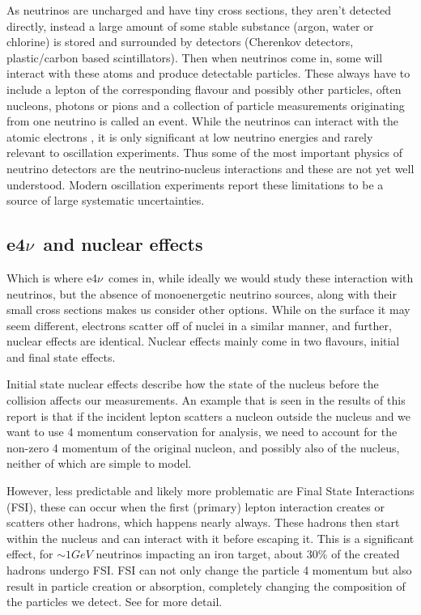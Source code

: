 \documentclass[a4paper,12pt]{article}
\newcommand{\efn}{e4$\nu$}
\begin{document}
As neutrinos are uncharged and have tiny cross sections, they aren't detected directly, instead a large amount of some stable substance (argon, water or chlorine) is stored and surrounded by detectors (Cherenkov detectors, plastic/carbon based scintillators).
Then when neutrinos come in, some will interact with these atoms and produce detectable particles.
These always have to include a lepton of the corresponding flavour and possibly other particles, often nucleons, photons or pions and a collection of particle measurements originating from one neutrino is called an event.
While the neutrinos can interact with the atomic electrons \cite{whittinghamScatteringLowEnergy2022}, it is only significant at low neutrino energies and rarely relevant to oscillation experiments.
Thus some of the most important physics of neutrino detectors are the neutrino-nucleus interactions and these are not yet well understood.
Modern oscillation experiments report these limitations to be a source of large systematic uncertainties\cite{abeConstraintMatterAntimatter2020,novacollaborationNewConstraintsOscillation2018}.

\subsection{\efn\ and nuclear effects}
Which is where \efn\ comes in, while ideally we would study these interaction with neutrinos, but the absence of monoenergetic neutrino sources, along with their small cross sections makes us consider other options.
While on the surface it may seem different, electrons scatter off of nuclei in a similar manner, and further, nuclear effects are identical.
Nuclear effects mainly come in two flavours, initial and final state effects.

Initial state nuclear effects describe how the state of the nucleus before the collision affects our measurements.
An example that is seen in the results of this report is that if the incident lepton scatters a nucleon outside the nucleus and we want to use 4 momentum conservation for analysis, we need to account for the non-zero 4 momentum of the original nucleon, and possibly also of the nucleus, neither of which are simple to model.

However, less predictable and likely more problematic are Final State Interactions (FSI), these can occur when the first (primary) lepton interaction creates or scatters other hadrons, which happens nearly always.
These hadrons then start within the nucleus and can interact with it before escaping it.
This is a significant effect, for $\sim 1\si{GeV}$ neutrinos impacting an iron target, about 30\% of the created hadrons undergo FSI\cite{stevendytmanFinalStateInteractions2009}.
FSI can not only change the particle 4 momentum but also result in particle creation or absorption, completely changing the composition of the particles we detect.
See \cite{golanEffectsFinalstateInteractions2012,stevendytmanFinalStateInteractions2009} for more detail.
\end{document}
